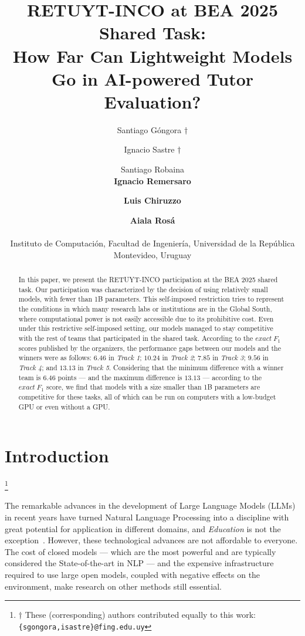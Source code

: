 \documentclass[11pt]{article}
\title{RETUYT-INCO at BEA 2025 Shared Task:\\ How Far Can Lightweight Models Go in AI-powered Tutor Evaluation?}
\author{Santiago Góngora $\dagger$ \and Ignacio Sastre $\dagger$ \and Santiago Robaina \\ {\bf Ignacio Remersaro} \and {\bf Luis Chiruzzo} \and {\bf Aiala Rosá}\\\\
Instituto de Computación, Facultad de Ingeniería, Universidad de la República \\ Montevideo, Uruguay}
\newcommand{\todo}[1]{\textcolor{blue}{\textbf{\small [TODO: #1]}}}
\newcommand\blfootnote[1]{
    \begingroup
    \renewcommand\thefootnote{}\footnote{#1}
    \addtocounter{footnote}{-1}
    \endgroup
}
\begin{document}
\maketitle
\begin{abstract}
In this paper, we present the RETUYT-INCO participation at the BEA 2025 shared task.
Our participation was characterized by the decision of using relatively small models, with fewer than 1B parameters.
This self-imposed restriction tries to represent the conditions in which many research labs or institutions are in the Global South, where computational power is not easily accessible due to its prohibitive cost.
Even under this restrictive self-imposed setting, our models managed to stay competitive with the rest of teams that participated in the shared task.
According to the $exact\ F_1$ scores published by the organizers, the performance gaps between our models and the winners were as follows: $6.46$ in \textit{Track 1}; $10.24$ in \textit{Track 2}; $7.85$ in \textit{Track 3}; $9.56$ in \textit{Track 4}; and $13.13$ in \textit{Track 5}.
Considering that the minimum difference with a winner team is $6.46$ points --- and the maximum difference is $13.13$ --- according to the $exact\ F_1$ score, we find that models with a size smaller than 1B parameters are competitive for these tasks, all of which can be run on computers with a low-budget GPU or even without a GPU.
\end{abstract}

\section{Introduction}
\label{sec:introduction}

\blfootnote{$\dagger$ These (corresponding) authors contributed equally to this work: \texttt{\{sgongora,isastre\}@fing.edu.uy}}



The remarkable advances in the development of Large Language Models (LLMs) in recent years have turned Natural Language Processing into a discipline with great potential for application in different domains, and \textit{Education} is not the exception~\citep{ignat-etal-2024-solved}. 
However, these technological advances are not affordable to everyone. 
The cost of closed models --- which are the most powerful and are typically considered the State-of-the-art in NLP --- and the expensive infrastructure required to use large open models, coupled with negative effects on the environment, make research on other methods still essential.
\end{document}
